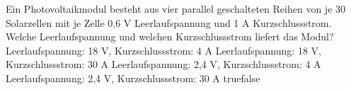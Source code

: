     {Ein Photovoltaikmodul besteht aus vier parallel geschalteten Reihen von je 30 Solarzellen mit je Zelle 0,6 V Leerlaufspannung und 1 A Kurzschlussstrom. Welche Leerlaufspannung und welchen Kurzschlussstrom liefert das Modul?}
    {Leerlaufspannung: 18 V, Kurzschlussstrom: 4 A}
    {Leerlaufspannung: 18 V, Kurzschlussstrom: 30 A}
    {Leerlaufspannung: 2,4 V, Kurzschlussstrom: 4 A}
    {Leerlaufspannung: 2,4 V, Kurzschlussstrom: 30 A}
    {true}{false}